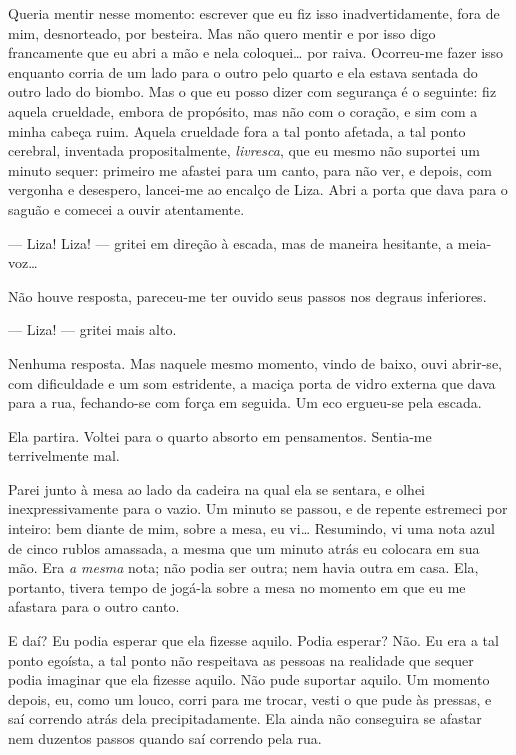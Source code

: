 Queria mentir nesse momento: escrever que eu fiz isso inadvertidamente,
fora de mim, desnorteado, por besteira. Mas não quero mentir e por isso
digo francamente que eu abri a mão e nela coloquei\ldots{} por raiva.
Ocorreu-me fazer isso enquanto corria de um lado para o outro pelo
quarto e ela estava sentada do outro lado do biombo. Mas o que eu posso
dizer com segurança é o seguinte: fiz aquela crueldade, embora de
propósito, mas não com o coração, e sim com a minha cabeça ruim. Aquela
crueldade fora a tal ponto afetada, a tal ponto cerebral, inventada
propositalmente, \textit{livresca}, que eu mesmo não suportei um minuto
sequer: primeiro me afastei para um canto, para não ver, e depois, com
vergonha e desespero, lancei-me ao encalço de Liza. Abri a porta que
dava para o saguão e comecei a ouvir atentamente.

--- Liza! Liza! --- gritei em direção à escada, mas de maneira hesitante, a
meia-voz\ldots{}

Não houve resposta, pareceu-me ter ouvido seus passos nos degraus
inferiores.

--- Liza! --- gritei mais alto.

Nenhuma resposta. Mas naquele mesmo momento, vindo de baixo, ouvi
abrir-se, com dificuldade e um som estridente, a maciça porta de vidro
externa que dava para a rua, fechando-se com força em seguida. Um eco
ergueu-se pela escada.

Ela partira. Voltei para o quarto absorto em pensamentos. Sentia-me
terrivelmente mal.

Parei junto à mesa ao lado da cadeira na qual ela se sentara, e olhei
inexpressivamente para o vazio. Um minuto se passou, e de repente estremeci por
inteiro: bem diante de mim, sobre a mesa, eu vi\ldots{} Resumindo, vi uma nota
azul de cinco rublos amassada, a mesma que um minuto atrás eu colocara em sua
mão. Era \textit{a mesma} nota; não podia ser outra; nem havia outra em casa.
Ela, portanto, tivera tempo de jogá-la sobre a mesa no momento em que eu me
afastara para o outro canto.

E daí? Eu podia esperar que ela fizesse aquilo. Podia esperar? Não. Eu
era a tal ponto egoísta, a tal ponto não respeitava as pessoas na
realidade que sequer podia imaginar que ela fizesse aquilo. Não pude
suportar aquilo. Um momento depois, eu, como um louco, corri para me
trocar, vesti o que pude às pressas, e saí correndo atrás dela
precipitadamente. Ela ainda não conseguira se afastar nem duzentos
passos quando saí correndo pela rua.

